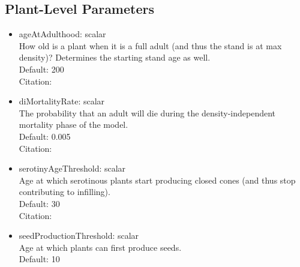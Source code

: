 \documentclass[12pt, english]{article}
\begin{document}
\subsection{Plant-Level Parameters}
\begin{itemize}
	\item{ageAtAdulthood: scalar\\How old is a plant when it is a full adult (and thus the stand is at max density)? Determines the starting stand age as well.\\Default: 200\\Citation: \citealt{Kashian2005}}
	\item{diMortalityRate: scalar\\The probability that an adult will die during the density-independent mortality phase of the model.\\Default: 0.005\\Citation: \citealt{vanMantgem2009}}
	\item{serotinyAgeThreshold: scalar\\Age at which serotinous plants start producing closed cones (and thus stop contributing to infilling).\\Default: 30\\Citation: \citealt{Lotan1976, Lotan1983}}
	\item{seedProductionThreshold: scalar\\Age at which plants can first produce seeds.\\Default: 10}
\end{itemize}
\end{document}
